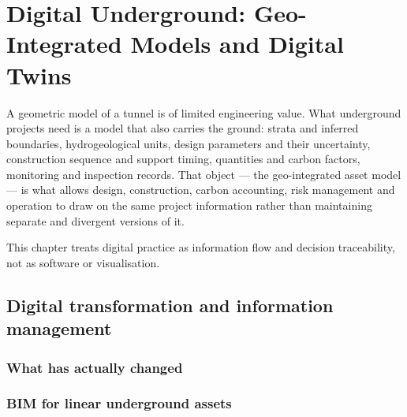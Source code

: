 \chapter{Digital Underground: Geo-Integrated Models and Digital Twins}
\label{ch:digital-underground}

A geometric model of a tunnel is of limited engineering value. What underground
projects need is a model that also carries the ground: strata and inferred
boundaries, hydrogeological units, design parameters and their uncertainty,
construction sequence and support timing, quantities and carbon factors,
monitoring and inspection records. That object --- the geo-integrated asset
model --- is what allows design, construction, carbon accounting, risk
management and operation to draw on the same project information rather than
maintaining separate and divergent versions of it.

This chapter treats digital practice as information flow and decision
traceability, not as software or visualisation.

\section{Digital transformation and information management}
\label{sec:digital-transformation-and-information-management}

\subsection{What has actually changed}
\label{sec:digital-transformation}

\subsection{BIM for linear underground assets}
\label{sec:bim-underground}

